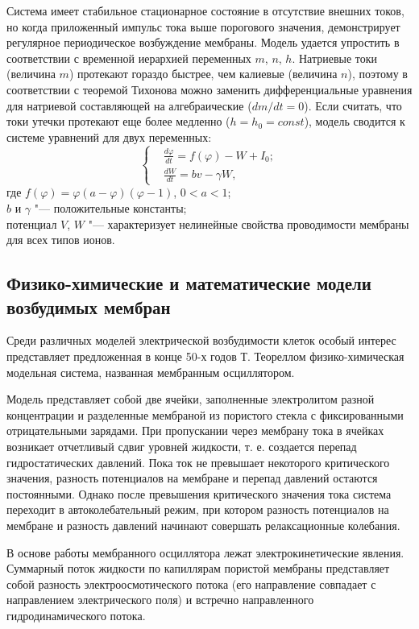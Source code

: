 \documentclass[12pt,a4paper,oneside]{book}
\begin{document}
Система имеет стабильное стационарное состояние в отсутствие внешних токов, но когда приложенный импульс тока выше порогового значения, демонстрирует регулярное периодическое возбуждение мембраны.
Модель удается упростить в соответствии с временной иерархией переменных $m$, $n$, $h$. Натриевые токи (величина $m$) протекают гораздо быстрее, чем калиевые (величина $n$), поэтому в соответствии с теоремой Тихонова можно заменить дифференциальные уравнения для натриевой составляющей на алгебраические ($dm/dt=0$). Если считать, что токи утечки протекают еще более медленно ($h = h_0 = const$), модель сводится к системе уравнений для двух переменных:
\begin{equation}
\left\{
	\begin{aligned}
	& \frac{d \varphi}{dt}=f(\varphi)-W+I_0;\\
	& \frac{dW}{dt}=bv-\gamma W, 
	\end{aligned}
\right.
\end{equation}
где $f(\varphi)=\varphi(a-\varphi)(\varphi-1)$, $0 < a < 1$;\\
$b$ и $\gamma$ "--- положительные константы;\\
потенциал $V$, $W$ "--- характеризует нелинейные свойства проводимости мембраны для всех типов ионов.


\subsection{Физико-химические и математические модели возбудимых мембран}

Среди различных моделей электрической возбудимости клеток особый интерес представляет предложенная в конце 50-х годов Т. Теореллом физико-химическая модельная система, названная мембранным осциллятором. 

Модель представляет собой две ячейки, заполненные электролитом разной концентрации и разделенные мембраной из пористого стекла с фиксированными отрицательными зарядами. 
При пропускании через мембрану тока в ячейках возникает отчетливый сдвиг уровней жидкости, т. е. создается перепад гидростатических давлений. Пока ток не превышает некоторого критического значения, разность потенциалов на мембране и перепад давлений остаются постоянными. Однако после превышения критического значения тока система переходит в автоколебательный режим, при котором разность потенциалов на мембране и разность давлений начинают совершать релаксационные колебания. 

В основе работы мембранного осциллятора лежат электрокинетические явления. Суммарный поток жидкости по капиллярам пористой мембраны представляет собой разность электроосмотического потока (его направление совпадает с направлением электрического поля) и встречно направленного гидродинамического потока. 
\end{document}
